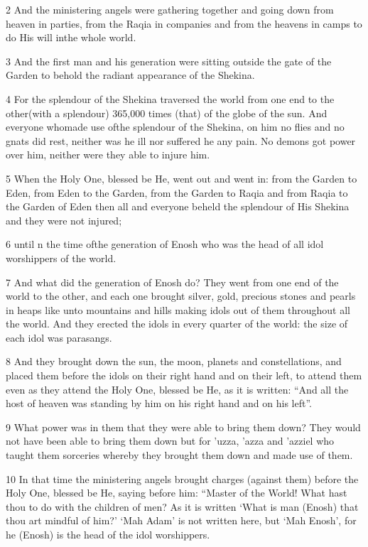\par 2 And the ministering angels were gathering together and going down from heaven in parties, from the Raqia in companies and from the heavens in camps to do His will inthe whole world. 

\par 3 And the first man and his generation were sitting outside the gate of the Garden to behold the radiant appearance of the Shekina. 

\par 4 For the splendour of the Shekina traversed the world from one end to the other(with a splendour) 365,000 times (that) of the globe of the sun. And everyone whomade use ofthe splendour of the Shekina, on him no flies and no gnats did rest, neither was he ill nor suffered he any pain. No demons got power over him, neither were they able to injure him. 

\par 5 When the Holy One, blessed be He, went out and went in: from the Garden to Eden, from Eden to the Garden, from the Garden to Raqia and from Raqia to the Garden of Eden then all and everyone beheld the splendour of His Shekina and they were not injured;

\par 6 until n the time ofthe generation of Enosh who was the head of all idol worshippers of the world.

\par 7 And what did the generation of Enosh do? They went from one end of the world to the other, and each one brought silver, gold, precious stones and pearls in heaps like unto mountains and hills making idols out of them throughout all the world. And they erected the idols in every quarter of the world: the size of each idol was parasangs.

\par 8 And they brought down the sun, the moon, planets and constellations, and placed them before the idols on their right hand and on their left, to attend them even as they attend the Holy One, blessed be He, as it is written: “And all the host of heaven was standing by him on his right hand and on his left”. 

\par 9 What power was in them that they were able to bring them down? They would not have been able to bring them down but for 'uzza, 'azza and 'azziel who taught them sorceries whereby they brought them down and made use of them. 

\par 10 In that time the ministering angels brought charges (against them) before the Holy One, blessed be He, saying before him: “Master of the World! What hast thou to do with the children of men? As it is written ‘What is man (Enosh) that thou art mindful of him?’ ‘Mah Adam’ is not written here, but ‘Mah Enosh’, for he (Enosh) is the head of the idol worshippers.

